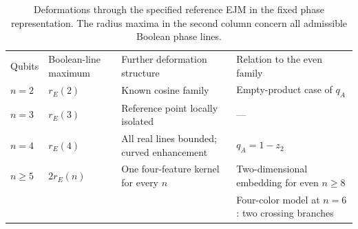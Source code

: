 \begin{table}[t]
\caption{Deformations through the specified reference EJM in the fixed phase representation. The radius maxima in the second column concern all admissible Boolean phase lines.}
\label{tab:summary}
\setlength{\tabcolsep}{3pt}
\begin{ruledtabular}
\begin{tabular}{p{}p{}p{}p{}}
Qubits & Boolean-line maximum & Further deformation structure & Relation to the even family\\
$n=2$ & $r_E(2)$ & Known cosine family & Empty-product case of $q_A$\\
$n=3$ & $r_E(3)$ & Reference point locally isolated & ---\\
$n=4$ & $r_E(4)$ & All real lines bounded; curved enhancement & $q_A=1-z_2$\\
$n\ge5$ & $2r_E(n)$ & One four-feature kernel for every $n$ & Two-dimensional embedding for even $n\ge8$\\
 & & & Four-color model at $n=6$: two crossing branches
\end{tabular}
\end{ruledtabular}
\end{table}
